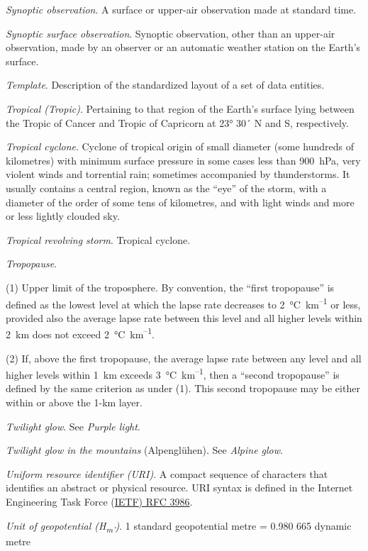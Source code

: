 \emph{Synoptic observation}. A surface or upper-air observation made at standard time.

\emph{Synoptic surface observation}. Synoptic observation, other than an upper-air observation, made by an observer or an automatic weather station on the Earth's surface.

\emph{Template}. Description of the standardized layout of a set of data entities.

\emph{Tropical (Tropic)}. Pertaining to that region of the Earth's surface lying between the Tropic of Cancer and Tropic of Capricorn at 23° 30´ N and S, respectively.

\emph{Tropical cyclone}. Cyclone of tropical origin of small diameter (some hundreds of kilometres) with minimum surface pressure in some cases less than 900~hPa, very violent winds and torrential rain; sometimes accompanied by thunderstorms. It usually contains a central region, known as the ``eye'' of the storm, with a diameter of the order of some tens of kilometres, and with light winds and more or less lightly clouded sky.

\emph{Tropical revolving storm}. Tropical cyclone.

\emph{Tropopause}.

(1) Upper limit of the troposphere. By convention, the ``first tropopause'' is defined as the lowest level at which the lapse rate decreases to 2~°C~km\textsuperscript{--1} or less, provided also the average lapse rate between this level and all higher levels within 2~km does not exceed 2~°C~km\textsuperscript{--1}.

(2) If, above the first tropopause, the average lapse rate between any level and all higher levels within 1~km exceeds 3~°C~km\textsuperscript{--1}, then a ``second tropopause'' is defined by the same criterion as under (1). This second tropopause may be either within or above the 1-km layer.

\emph{Twilight glow}. See \emph{Purple light}.

\emph{Twilight glow in the mountains} (Alpenglühen). See \emph{Alpine glow}.

\emph{Uniform resource identifier (URI)}. A compact sequence of characters that identifies an abstract or physical resource. URI syntax is defined in the Internet Engineering Task Force (\href{http://www.ietf.org/rfc/rfc3986.txt}{IETF) RFC 3986}.

\emph{Unit of geopotential (H\textsubscript{m'})}. 1 standard geopotential metre = 0.980 665 dynamic metre

